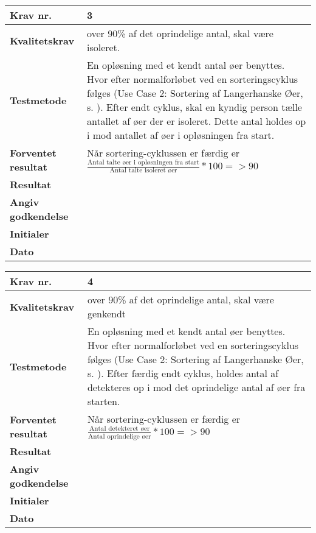 	\begin{center}
		\begin{longtable}{ | m{4cm}| m{8.5cm}|} 
			\hline
			\textbf{Krav nr.} & 3 \\ 
			\hline
			\textbf{Kvalitetskrav} & over 90\% af det oprindelige antal, skal være isoleret. \\
			\hline
			\textbf{Testmetode} &  En opløsning med et kendt antal øer benyttes. Hvor efter normalforløbet ved en sorteringscyklus følges (Use Case 2: Sortering af Langerhanske Øer, s. \pageref{uc:2}). Efter endt cyklus, skal en kyndig person tælle antallet af øer der er isoleret. Dette antal holdes op i mod antallet af øer i opløsningen fra start.  \\
			\hline
			\textbf{Forventet resultat}  & Når sortering-cyklussen er færdig er
 $\frac{\text{Antal talte øer i opløsningen fra start}}{\text{Antal talte isoleret øer}}*100= >90$
 \\
			\hline
			\textbf{Resultat}  &    \\
			\hline
			\textbf{Angiv godkendelse} &     \\
			\hline
			\textbf{Initialer} &     \\
			\hline
			\textbf{Dato} &    \\
			\hline
		\end{longtable}
	\end{center}		
			
	\begin{center}
		\begin{longtable}{ | m{4cm}| m{8.5cm}|} 
			\hline
			\textbf{Krav nr.} & 4 \\ 
			\hline
			\textbf{Kvalitetskrav} & over 90\% af det oprindelige antal, skal være genkendt \\
			\hline
			\textbf{Testmetode} &  En opløsning med et kendt antal øer benyttes. Hvor efter normalforløbet ved en sorteringscyklus følges (Use Case 2: Sortering af Langerhanske Øer, s. \pageref{uc:2}). Efter færdig endt cyklus, holdes antal af detekteres op i mod det oprindelige antal af øer fra starten.  \\
			\hline
			\textbf{Forventet resultat}  & Når sortering-cyklussen er færdig er
 $\frac{\text{Antal detekteret øer}}{\text{Antal oprindelige øer}} * 100 = >90$ \\
			\hline
			\textbf{Resultat}  &    \\
			\hline
			\textbf{Angiv godkendelse} &     \\
			\hline
			\textbf{Initialer} &     \\
			\hline
			\textbf{Dato} &    \\
			\hline
		\end{longtable}
	\end{center}				
			
